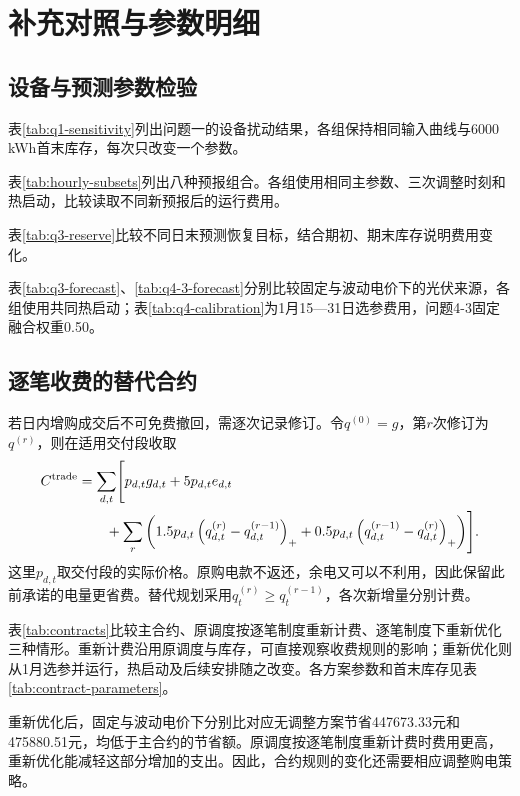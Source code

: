 \section{补充对照与参数明细}\label{app:checks}
\subsection{设备与预测参数检验}\label{app:parameter-checks}
表\ref{tab:q1-sensitivity}列出问题一的设备扰动结果，各组保持相同输入曲线与6000\,kWh首末库存，每次只改变一个参数。

\FloatBarrier
表\ref{tab:hourly-subsets}列出八种预报组合。各组使用相同主参数、三次调整时刻和热启动，比较读取不同新预报后的运行费用。

表\ref{tab:q3-reserve}比较不同日末预测恢复目标，结合期初、期末库存说明费用变化。

\FloatBarrier
表\ref{tab:q3-forecast}、\ref{tab:q4-3-forecast}分别比较固定与波动电价下的光伏来源，各组使用共同热启动；表\ref{tab:q4-calibration}为1月15—31日选参费用，问题4-3固定融合权重0.50。



\FloatBarrier

\subsection{逐笔收费的替代合约}\label{sec:contracts}
若日内增购成交后不可免费撤回，需逐次记录修订。令$q^{(0)}=g$，第$r$次修订为$q^{(r)}$，则在适用交付段收取
\begin{equation}
 \begin{aligned}[b]
 C^{\mathrm{trade}}&=\sum_{d,t}\Biggl[p_{d,t}g_{d,t}+5p_{d,t}e_{d,t}\\
 &\qquad+\sum_r\left(1.5p_{d,t}\left(q^{(r)}_{d,t}-q^{(r-1)}_{d,t}\right)_{+}
 +0.5p_{d,t}\left(q^{(r-1)}_{d,t}-q^{(r)}_{d,t}\right)_{+}\right)\Biggr].
 \end{aligned}
\end{equation}
这里$p_{d,t}$取交付段的实际价格。原购电款不返还，余电又可以不利用，因此保留此前承诺的电量更省费。替代规划采用$q^{(r)}_t\ge q^{(r-1)}_t$，各次新增量分别计费。

表\ref{tab:contracts}比较主合约、原调度按逐笔制度重新计费、逐笔制度下重新优化三种情形。重新计费沿用原调度与库存，可直接观察收费规则的影响；重新优化则从1月选参并运行，热启动及后续安排随之改变。各方案参数和首末库存见表\ref{tab:contract-parameters}。


\FloatBarrier
重新优化后，固定与波动电价下分别比对应无调整方案节省447673.33元和475880.51元，均低于主合约的节省额。原调度按逐笔制度重新计费时费用更高，重新优化能减轻这部分增加的支出。因此，合约规则的变化还需要相应调整购电策略。


